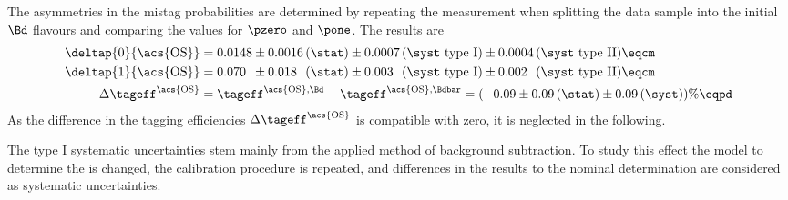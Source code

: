 %
The asymmetries in the mistag probabilities are determined by repeating the
measurement when splitting the data sample into the initial $\Bd$ flavours and
comparing the values for $\pzero$ and $\pone$. The results are
%
\begin{equation}\label{eq:flavour_tagging:calibration:os:asymmetries}
  \begin{split}
    \deltap{0}{\text{\acs{OS}}} &= 0.0148 \pm 0.0016 \text{\,(\stat)} \pm  0.0007 \text{\,(\syst type I)} \pm  0.0004 \text{\,(\syst type II)} \eqcm \\ %
    \deltap{1}{\text{\acs{OS}}} &= 0.070\phantom{0} \pm 0.018\phantom{0} \text{\,(\stat)} \pm 0.003\phantom{0} \text{\,(\syst type I)} \pm 0.002\phantom{0} \text{\,(\syst type II)} \eqcm \\ %
    \Delta \tageff^{\text{\acs{OS}}} &= \tageff^{\text{\acs{OS},\Bd}} - \tageff^{\text{\acs{OS},\Bdbar}} = (-0.09  \pm 0.09 \text{\,(\stat)} \pm   0.09 \text{\,(\syst)})\% \eqpd
  \end{split}
\end{equation}
%
As the difference in the tagging efficiencies $\Delta \tageff^{\text{\acs{OS}}}$
is compatible with zero, it is neglected in the following.

The type I systematic uncertainties stem mainly from the applied method of
background subtraction. To study this effect the model to determine the
\sweights is changed, the calibration procedure is repeated, and differences in
the results to the nominal determination are considered as systematic
uncertainties.

